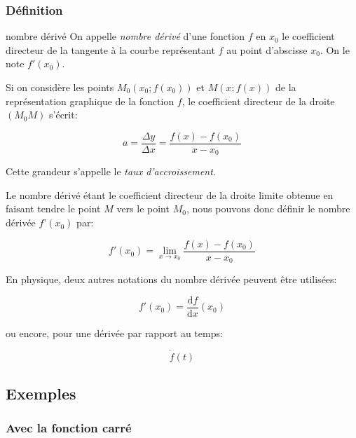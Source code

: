 \documentclass[a4paper,12pt]{scrartcl}
\begin{document}
\subsubsection{Définition}

\begin{definition}{nombre dérivé}
On appelle \emph{nombre dérivé} d'une fonction $f$ en $x_0$ le coefficient directeur de la tangente à la courbe représentant $f$ au point d'abscisse $x_0$. On le note $f'(x_0)$. 
\end{definition}

Si on considère les points $M_0(x_0;f(x_0))$ et $M(x ; f(x))$ de la représentation graphique de la fonction $f$,  le  coefficient directeur de la droite $(M_0M)$ s’écrit: 

\begin{equation*}
a = \frac{\Delta y}{\Delta x} = \dfrac{f(x) - f(x_0)}{x - x_0}
\end{equation*}

Cette grandeur s'appelle le \emph{taux d'accroissement}.

Le nombre dérivé étant le coefficient directeur de la droite limite obtenue en faisant tendre le point $M$ vers le point $M_0$, nous pouvons  donc définir le nombre dérivée $f’(x_0)$ par: 

\begin{equation*}
f'(x_0) = \lim_{x \rightarrow x_0} \dfrac{f(x) - f(x_0)}{x - x_0}
\end{equation*}

En physique, deux autres notations du nombre dérivée peuvent être utilisées:

\begin{equation*}
f'(x_0) = \dfrac{\mathrm{d} f}{\mathrm{d} x}(x_0)
\end{equation*}

ou encore, pour une dérivée par rapport au temps:

\begin{equation*}
 \dot{f}(t)
\end{equation*}



\subsection{Exemples}

\subsubsection{Avec la fonction carré}
\end{document}
